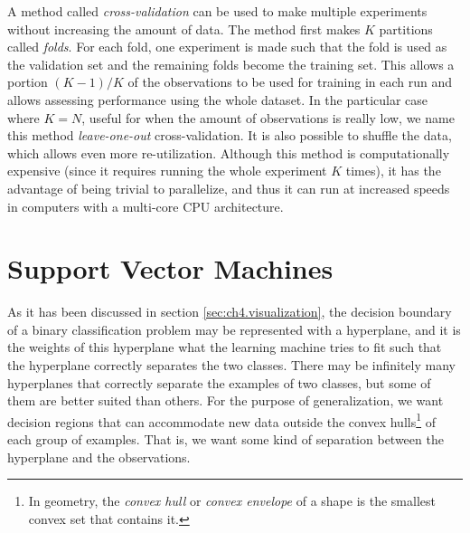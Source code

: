 A method called \emph{cross-validation} can be used to make mul\-ti\-ple experiments with\-out increasing the amount of data. The method first makes $K$ partitions called \emph{folds}. For each fold, one experiment is made such that the fold is used as the validation set and the remaining folds become the training set. This allows a portion $(K-1)/K$ of the observations to be used for training in each run and allows assessing performance using the whole dataset. In the particular case where $K = N$, useful for when the amount of observations is really low, we name this method \emph{leave-one-out} cross-validation. It is also possible to shuffle the data, which allows even more re-utilization. Although this method is computationally expensive (since it requires running the whole experiment $K$ times), it has the advantage of being trivial to parallelize, and thus it can run at increased speeds in computers with a multi-core CPU architecture. 

\section{Support Vector Machines}

As it has been discussed in section \ref{sec:ch4.visualization}, the decision boundary of a binary class\-ification prob\-lem may be represented with a hyperplane, and it is the weights of this hyperplane what the learning machine tries to fit such that the hyper\-plane correctly separates the two classes. There may be infinitely many hyperplanes that correctly separate the examples of two classes, but some of them are better suited than others. For the purpose of generalization, we want decision regions that can accommodate new data outside the convex hulls\footnote{In geometry, the \emph{convex hull} or \emph{convex envelope} of a shape is the smallest convex set that contains it.} of each group of examples. That is, we want some kind of separation between the hyperplane and the observations.

